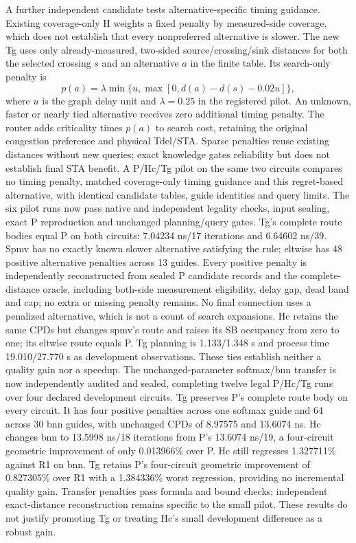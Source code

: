 \documentclass[conference,10pt]{IEEEtran}
\begin{document}
A further independent candidate tests alternative-specific timing guidance. Existing coverage-only H weights a fixed penalty by measured-side coverage, which does not establish that every nonpreferred alternative is slower. The new Tg uses only already-measured, two-sided source/crossing/sink distances for both the selected crossing $s$ and an alternative $a$ in the finite table. Its search-only penalty is
\[
 p(a)=\lambda\min\{u,\max[0,d(a)-d(s)-0.02u]\},
\]
where $u$ is the graph delay unit and $\lambda=0.25$ in the registered pilot. An unknown, faster or nearly tied alternative receives zero additional timing penalty. The router adds criticality times $p(a)$ to search cost, retaining the original congestion preference and physical Tdel/STA. Sparse penalties reuse existing distances without new queries; exact knowledge gates reliability but does not establish final STA benefit. A P/Hc/Tg pilot on the same two circuits compares no timing penalty, matched coverage-only timing guidance and this regret-based alternative, with identical candidate tables, guide identities and query limits. The six pilot runs now pass native and independent legality checks, input sealing, exact P reproduction and unchanged planning/query gates. Tg's complete route bodies equal P on both circuits: 7.04234 ns/17 iterations and 6.64602 ns/39. Spmv has no exactly known slower alternative satisfying the rule; eltwise has 48 positive alternative penalties across 13 guides. Every positive penalty is independently reconstructed from sealed P candidate records and the complete-distance oracle, including both-side measurement eligibility, delay gap, dead band and cap; no extra or missing penalty remains. No final connection uses a penalized alternative, which is not a count of search expansions. Hc retains the same CPDs but changes spmv's route and raises its SB occupancy from zero to one; its eltwise route equals P. Tg planning is 1.133/1.348 s and process time 19.010/27.770 s as development observations. These ties establish neither a quality gain nor a speedup. The unchanged-parameter softmax/bnn transfer is now independently audited and sealed, completing twelve legal P/Hc/Tg runs over four declared development circuits. Tg preserves P's complete route body on every circuit. It has four positive penalties across one softmax guide and 64 across 30 bnn guides, with unchanged CPDs of 8.97575 and 13.6074 ns. Hc changes bnn to 13.5998 ns/18 iterations from P's 13.6074 ns/19, a four-circuit geometric improvement of only 0.013966\% over P. Hc still regresses 1.327711\% against R1 on bnn. Tg retains P's four-circuit geometric improvement of 0.827305\% over R1 with a 1.384336\% worst regression, providing no incremental quality gain. Transfer penalties pass formula and bound checks; independent exact-distance reconstruction remains specific to the small pilot. These results do not justify promoting Tg or treating Hc's small development difference as a robust gain.
\end{document}
